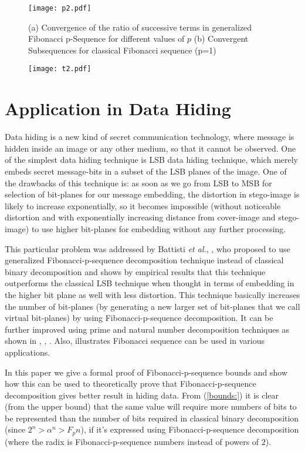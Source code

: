 \documentclass{ijcsa}
\begin{document}
\begin{figure}[htbp]
	\label{fig:f2}
	\centering
		\texttt{[image: p2.pdf]}
	\caption{(a) Convergence of the ratio of successive terms in generalized Fibonacci p-Sequence for different values of $p$
					 (b) Convergent Subsequences for classical Fibonacci sequence (p=1)}
\end{figure}

\begin{figure}[htbp]
	\label{fig:t2}
	\centering
		\texttt{[image: t2.pdf]}
\end{figure}

\section{Application in Data Hiding}
\par Data hiding is a new kind of secret communication technology, where message is hidden inside 
an image or any other medium, so that it cannot be observed. One of the simplest data hiding technique
is LSB data hiding technique, which merely embeds secret message-bits in a subset of the LSB planes of 
the image. One of the drawbacks of this technique is: as soon as we go from LSB to MSB for selection of 
bit-planes for our message embedding, the distortion in stego-image is likely to increase
exponentially, so it becomes impossible (without noticeable distortion and with exponentially increasing 
distance from cover-image and stego-image) to use higher bit-planes for embedding without any further 
processing.

\par This particular problem was addressed by Battisti {\it et al.}, \cite{battisti06}, who proposed to use generalized 
Fibonacci-p-sequence decomposition technique instead of classical binary decomposition and shows by empirical 
results that this technique outperforms the classical LSB technique when thought in terms of embedding in the 
higher bit plane as well with less distortion. This technique basically increases the number of bit-planes (by generating
a new larger set of bit-planes that we call virtual bit-planes) by using Fibonacci-p-sequence decomposition. It can 
be further improved using prime and natural number decomposition techniques as shown in \cite{dey07a}, \cite{dey07b}, 
\cite{dey08}. Also, \cite{cooper84} \cite{dotson93} illustrates Fibonacci sequence can be used in various applications.

\par In this paper we give a formal proof of Fibonacci-p-sequence bounds and show how this can be used to theoretically 
prove that Fibonacci-p-sequence decomposition gives better result in hiding data. From (\ref{bounds:}) it is clear 
(from the upper bound) that the same value will require more numbers of bits to be represented than the number of bits required in classical binary decomposition (since $2^n>\alpha^n>F_p{n}$), if it's expressed using Fibonacci-p-sequence decomposition (where the radix is Fibonacci-p-sequence numbers instead of powers of $2$). \\
\end{document}
